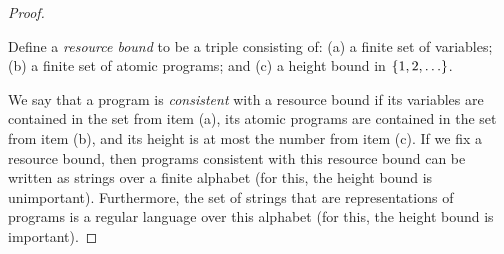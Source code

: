 \begin{proof}
    \begin{definition}
        Define a \emph{resource bound} to be a triple consisting of: (a) a finite set of variables; (b) a finite set of atomic programs; and (c)  a height bound in $\{1,2,\ldots\}$.        
    \end{definition}
    We say that a program is \emph{consistent} with a resource bound if  its variables are contained in the set from item (a), its atomic programs are contained in the  set from item (b), and its  height is at most  the number from item (c). If we fix a resource bound, then programs consistent with this resource bound can be written as strings over a finite alphabet (for this, the height bound is unimportant). Furthermore, the set of strings that are representations of programs is a regular language over this alphabet (for this, the height bound is important). 
    


\end{proof}
